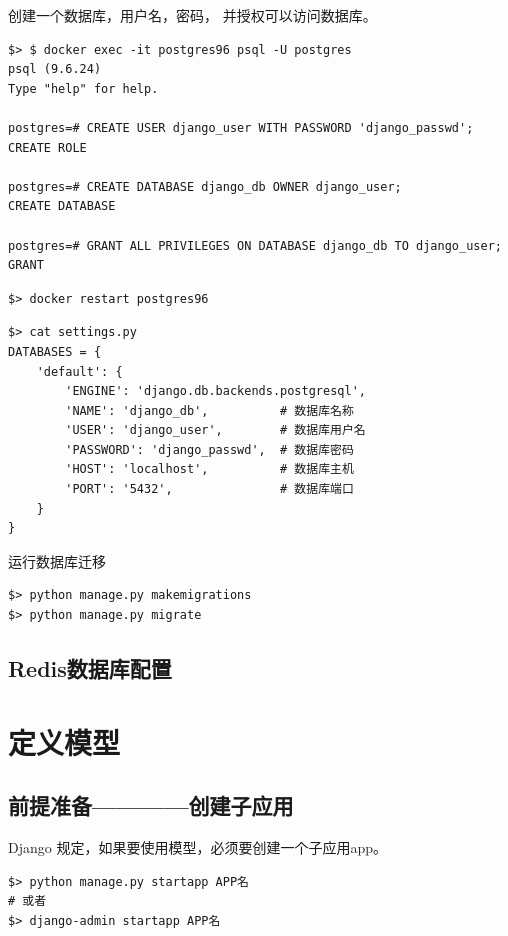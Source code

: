 \begin{example}
    \exProblem
    创建一个数据库，用户名，密码，
    并授权可以访问数据库。

    \exSolution
\begin{lstlisting}[style=demostyle,numbers=none]
$> $ docker exec -it postgres96 psql -U postgres
psql (9.6.24)
Type "help" for help.

postgres=# CREATE USER django_user WITH PASSWORD 'django_passwd';
CREATE ROLE

postgres=# CREATE DATABASE django_db OWNER django_user;
CREATE DATABASE

postgres=# GRANT ALL PRIVILEGES ON DATABASE django_db TO django_user;
GRANT
\end{lstlisting}

\begin{lstlisting}[style=demostyle,numbers=none]
$> docker restart postgres96
\end{lstlisting}

\begin{lstlisting}[style=demostyle,numbers=none]
$> cat settings.py
DATABASES = {
    'default': {
        'ENGINE': 'django.db.backends.postgresql',
        'NAME': 'django_db',          # 数据库名称
        'USER': 'django_user',        # 数据库用户名
        'PASSWORD': 'django_passwd',  # 数据库密码
        'HOST': 'localhost',          # 数据库主机
        'PORT': '5432',               # 数据库端口
    }
}
\end{lstlisting}    

运行数据库迁移
\begin{lstlisting}[style=demostyle,numbers=none]
$> python manage.py makemigrations
$> python manage.py migrate
\end{lstlisting}



    
\end{example}


\subsection{Redis数据库配置}

\section{定义模型}
\subsection{前提准备————创建子应用}
Django 规定，如果要使用模型，必须要创建一个子应用app。
\begin{lstlisting}[style=demostyle,numbers=none]
$> python manage.py startapp APP名
# 或者
$> django-admin startapp APP名
\end{lstlisting}

